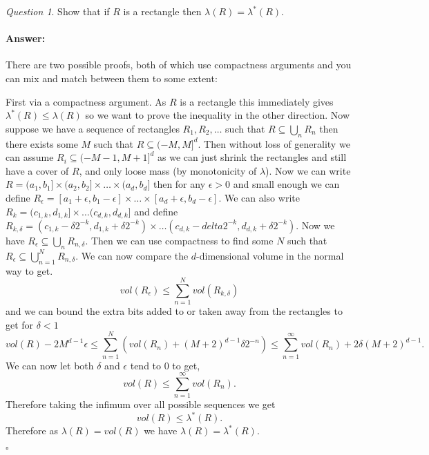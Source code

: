 \documentclass[11pt]{article}
\theoremstyle{definition}
\theoremstyle{remark}
\newtheorem{q}[thm]{Question}
\newenvironment{ans}{\paragraph{Answer:}}{\hfill$\square$}
\begin{document}
\begin{q}
Show that if $R$ is a rectangle then $\lambda(R) = \lambda^*(R)$.
\end{q}
\begin{ans}
There are two possible proofs, both of which use compactness arguments and you can mix and match between them to some extent: 

First via a compactness argument. As $R$ is a rectangle this immediately gives $\lambda^*(R) \leq \lambda(R)$ so we want to prove the inequality in the other direction. Now suppose we have a sequence of rectangles $R_1, R_2, \dots $ such that $R \subseteq \bigcup_n R_n$ then there exists some $M$ such that $R \subseteq (-M, M]^d$. Then without loss of generality we can assume $R_i \subseteq (-M-1, M+1]^d$ as we can just shrink the rectangles and still have a cover of $R$, and only loose mass (by monotonicity of $\lambda$). Now we can write $R= (a_1, b_1] \times (a_2, b_2] \times \dots \times (a_d, b_d]$ then for any $\epsilon >0$ and small enough we can define $R_\epsilon = [a_1+\epsilon, b_1-\epsilon] \times \dots \times [a_d + \epsilon, b_d - \epsilon]$. We can also write $R_k = (c_{1,k}, d_{1,k}] \times \dots (c_{d,k}, d_{d,k}]$ and define $R_{k,\delta} = (c_{1,k}-\delta2^{-k}, d_{1,k}+\delta 2^{-k}) \times \dots (c_{d,k} - delta 2^{-k}, d_{d,k} + \delta 2^{-k})$. Now we have $R_\epsilon \subseteq \bigcup_n R_{n, \delta}$. Then we can use compactness to find some $N$ such that $R_{\epsilon} \subseteq \bigcup_{n=1}^N R_{n, \delta}$. We can now compare the $d$-dimensional volume in the normal way to get.
\[ vol(R_{\epsilon}) \leq \sum_{n=1}^N vol(R_{k,\delta}) \] and we can bound the extra bits added to or taken away from the rectangles to get for $\delta <1$ 
\[ vol(R) - 2M^{d-1}\epsilon \leq \sum_{n=1}^N (vol(R_{n})+(M+2)^{d-1}\delta 2^{-n}) \leq \sum_{n=1}^\infty vol(R_n) + 2 \delta (M+2)^{d-1}. \] We can now let both $\delta$ and $\epsilon$ tend to $0$ to get,
\[ vol(R) \leq \sum_{n=1}^\infty vol(R_n). \] Therefore taking the infimum over all possible sequences we get
\[ vol(R) \leq \lambda^*(R). \] Therefore as $\lambda(R) = vol(R)$ we have $\lambda(R) = \lambda^*(R)$.


\end{ans}
\end{document}
